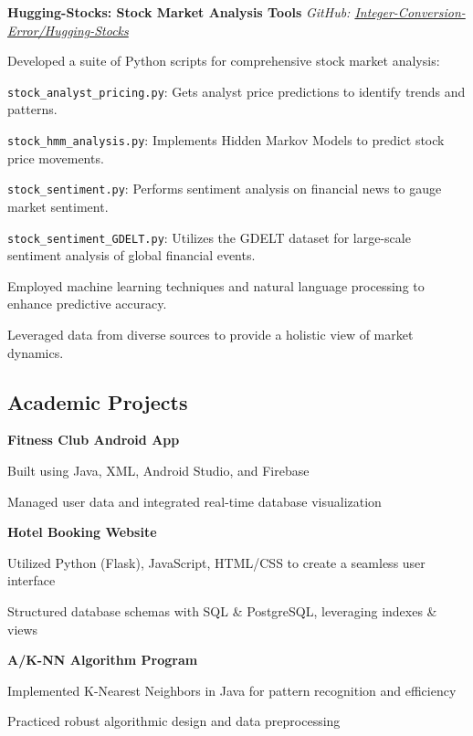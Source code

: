 \documentclass[11pt]{article}
\begin{document}
\begin{small}
\noindent\textbf{Hugging-Stocks: Stock Market Analysis Tools} \hfill \textit{GitHub: \href{https://github.com/Integer-Conversion-Error/Hugging-Stocks}{Integer-Conversion-Error/Hugging-Stocks}}
\begin{compactitem}
    \item Developed a suite of Python scripts for comprehensive stock market analysis:
    \begin{compactitem}
        \item \texttt{stock\_analyst\_pricing.py}: Gets analyst price predictions to identify trends and patterns.
        \item \texttt{stock\_hmm\_analysis.py}: Implements Hidden Markov Models to predict stock price movements.
        \item \texttt{stock\_sentiment.py}: Performs sentiment analysis on financial news to gauge market sentiment.
        \item \texttt{stock\_sentiment\_GDELT.py}: Utilizes the GDELT dataset for large-scale sentiment analysis of global financial events.
    \end{compactitem}
    \item Employed machine learning techniques and natural language processing to enhance predictive accuracy.
    \item Leveraged data from diverse sources to provide a holistic view of market dynamics.
\end{compactitem}
\subsection*{Academic Projects}

\noindent\textbf{Fitness Club Android App}
\begin{compactitem}
    \item Built using Java, XML, Android Studio, and Firebase
    \item Managed user data and integrated real-time database visualization
\end{compactitem}

\noindent\textbf{Hotel Booking Website}
\begin{compactitem}
    \item Utilized Python (Flask), JavaScript, HTML/CSS to create a seamless user interface
    \item Structured database schemas with SQL \& PostgreSQL, leveraging indexes \& views
\end{compactitem}

\noindent\textbf{A/K-NN Algorithm Program}
\begin{compactitem}
    \item Implemented K-Nearest Neighbors in Java for pattern recognition and efficiency
    \item Practiced robust algorithmic design and data preprocessing
\end{compactitem}

\end{small}
\end{document}
